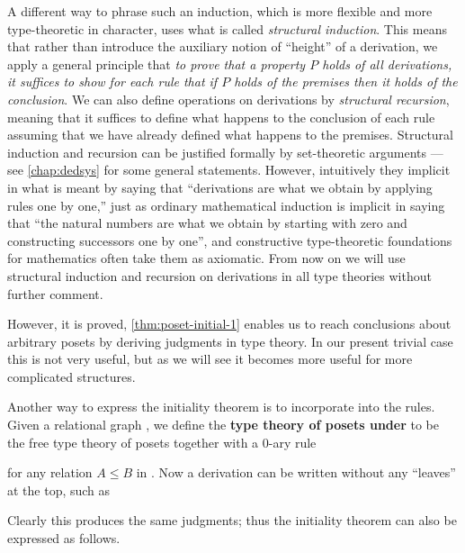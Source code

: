A different way to phrase such an induction, which is more flexible and more type-theoretic in character, uses what is called \emph{structural induction}.
This means that rather than introduce the auxiliary notion of ``height'' of a derivation, we apply a general principle that \emph{to prove that a property $P$ holds of all derivations, it suffices to show for each rule that if $P$ holds of the premises then it holds of the conclusion}.
We can also define operations on derivations by \emph{structural recursion}, meaning that it suffices to define what happens to the conclusion of each rule assuming that we have already defined what happens to the premises.
Structural induction and recursion can be justified formally by set-theoretic arguments --- see \cref{chap:dedsys} for some general statements.
However, intuitively they implicit in what is meant by saying that ``derivations are what we obtain by applying rules one by one,'' just as ordinary mathematical induction is implicit in saying that ``the natural numbers are what we obtain by starting with zero and constructing successors one by one'', and constructive type-theoretic foundations for mathematics often take them as axiomatic.
From now on we will use structural induction and recursion on derivations in all type theories without further comment.

However, it is proved, \cref{thm:poset-initial-1} enables us to reach conclusions about arbitrary posets by deriving judgments in type theory.
In our present trivial case this is not very useful, but as we will see it becomes more useful for more complicated structures.

Another way to express the initiality theorem is to incorporate \cG into the rules.
Given a relational graph \cG, we define the \textbf{type theory of posets under \cG} to be the free type theory of posets together with a 0-ary rule
\begin{mathpar}
\end{mathpar}
for any relation $A\le B$ in \cG.
Now a derivation can be written without any ``leaves'' at the top, such as
\begin{mathpar}
\end{mathpar}
Clearly this produces the same judgments; thus the initiality theorem can also be expressed as follows.

